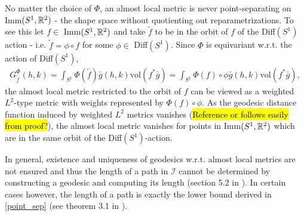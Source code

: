 No matter the choice of $\Phi$, an almost local metric is never point-separating on Imm$(S^1, \mathbb{R}^2)$ - the shape space without quotienting out reparametrizations. To see this let $f \in$ Imm$(S^1, \mathbb{R}^2)$ and take $\tilde{f}$ to be in the orbit of $f$ of the Diff$(S^1)$ action - i.e. $\tilde{f} = \phi \circ f$ for some $\phi \in$ Diff$(S^1)$. Since $\Phi$ is equivariant w.r.t. the action of Diff$(S^1)$, 
\begin{align*}
G_{\tilde{f}}^\Phi (h,k) = \int_{S^1} \Phi(\tilde{f}) \bar{g}(h,k) \text{vol}(f^* \bar{g}) = \int_{S^1} \Phi(f) \circ \phi \bar{g}(h,k) \text{vol}(f^* \bar{g}),
\end{align*}
the almost local metric restricted to the orbit of $f$ can be viewed as a weighted $L^2$-type metric with weights represented by $\Phi(f) \circ \phi$. As the geodesic distance function induced by weighted $L^2$ metrics vanishes (\hl{Reference or follows easily from proof?}), the almost local metric vanishes for points in Imm$(S^1, \mathbb{R}^2)$ which are in the same orbit of the Diff$(S^1)$-action.

In general, existence and uniqueness of geodesics w.r.t. almost local metrics are not ensured and thus the length of a path in $\mathcal{I}$ cannot be determined by constructing a geodesic and computing its length (section 5.2 in \cite{bauer2014overview}). In certain cases however, the length of a path is exactly the lower bound derived in \ref{point_sep} (see theorem 3.1 in \cite{shah2007h0type}).

